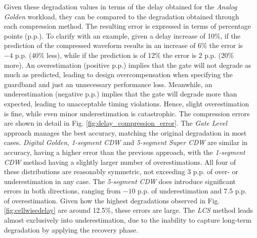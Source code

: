 
Given these degradation values in terms of the delay obtained for the \textit{Analog Golden} workload, they can be compared to the degradation obtained through each compression method. The resulting error is expressed in terms of percentage points (p.p.). To clarify with an example, given a delay increase of 10\%, if the prediction of the compressed waveform results in an increase of 6\% the error is $-4$ p.p. (40\% less), while if the prediction is of 12\% the error is $2$ p.p. (20\% more). An overestimation (positive p.p.) implies that the gate will not degrade as much as predicted, leading to design overcompensation when specifying the guardband and just an unnecessary performance loss. Meanwhile, an underestimation (negative p.p.) implies that the gate will degrade more than expected, leading to unacceptable timing violations. Hence, slight overestimation is fine, while even minor underestimation is catastrophic. The compression errors are shown in detail in Fig. \ref{fig:delay_compression_error}. The \textit{Gate Level} approach manages the best accuracy, matching the original degradation in most cases. \textit{Digital Golden}, \textit{1-segment CDW} and \textit{5-segment Super CDW} are similar in accuracy, having a higher error than the previous approach, with the \textit{1-segment CDW} method having a slightly larger number of overestimations.  All four of these distributions are reasonably symmetric, not exceeding 3 p.p. of over- or underestimation in any case. The \textit{5-segment CDW} does introduce significant errors in both directions, ranging from $-10$ p.p. of underestimation and 7.5 p.p. of overestimation. Given how the highest degradations observed in Fig. \ref{fig:cellwisedelay} are around 12.5\%, these errors are large. The \textit{LCS} method leads almost exclusively into underestimation, due to the inability to capture long-term degradation by applying the recovery phase. 

